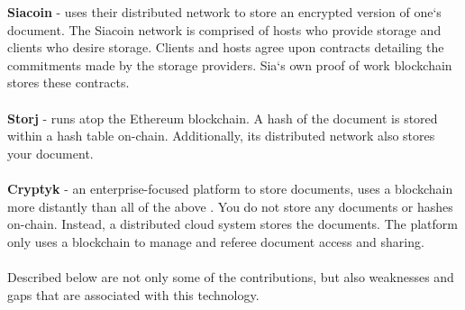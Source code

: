 \textbf{Siacoin}\cite{art7} - uses their distributed network to store an encrypted version of one`s document. The Siacoin network is comprised of hosts who provide storage and clients who desire storage. Clients and hosts agree upon contracts detailing the commitments made by the storage providers. Sia`s own proof of work blockchain stores these contracts.\\\\
\textbf{Storj}\cite{art8} - runs atop the Ethereum\cite{art13} blockchain. A hash of the document is stored within a hash table on-chain. Additionally, its distributed network also stores your document.\\\\
\textbf{Cryptyk}\cite{art9} - an enterprise-focused platform to store documents, uses a blockchain more distantly than all of the above	. You do not store any documents or hashes on-chain. Instead, a distributed cloud system stores the documents. The platform only uses a blockchain to manage and referee document access and sharing.\\\\
Described below are not only some of the contributions, but also weaknesses and gaps that are associated with this technology.
